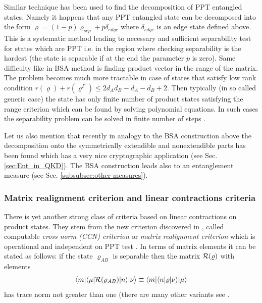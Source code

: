 \documentclass[rmp,12pt,preprint]{revtex4-2}
\begin{document}
Similar technique has been used to find the decomposition of PPT
entangled states. Namely it happens that any PPT entangled state can
be decomposed into the form $\varrho=(1-p) \varrho_{sep} +
p\delta_{edge}$ where $\delta_{edge}$ is an edge state defined
above.
This is a systematic method leading to necessary and sufficient
separability test for states which are PPT i.e. in the
region where checking separability is the hardest (the state is
separable if at the end the parameter $p$ is zero). Same difficulty
like in BSA method is finding product vector in  the range of the
matrix. The problem becomes much more tractable in case of states
that satisfy low rank condition \cite{Ho00} $r(\varrho)+
r(\varrho^{\Gamma}) \leq 2d_{A}d_{B}-d_{A}-d_{B}+2$. Then
typically (in so called generic case) the state has only finite
number of product states satisfying the range criterion which can
be found by solving polynomial equations. In such cases the
separability problem can be solved in finite number of steps
\cite{Ho00}.

Let us also mention that recently in analogy to the BSA construction
above the decomposition onto the symmetrically extendible and
nonextendible parts has been found which has a very nice cryptographic
application \cite{MoroderCL2005-povmintr} (see
Sec. \ref{sec:Ent_in_QKD}). The BSA construction leads also to an
entanglement measure (see Sec. \ref{subsubsec:other-measures}).



\subsubsection{Matrix realignment criterion and linear contractions
criteria}
\label{subsubsec:realignment}

There is yet another strong class of criteria based on linear
contractions on product states. They stem from the new criterion
discovered in \cite{Rudolph2003-JPA}, \cite{ChenWu} called computable
{\it cross norm (CCN) criterion} or {\it matrix realignment criterion}
which is operational and independent on PPT test \cite{Peres96}. In
terms of matrix elements it can be stated as follows: if the state
$\varrho_{AB}$ is separable then the matrix ${\cal R}(\varrho)$ with
elements
\begin{equation}
\langle m| \langle \mu| {\cal R}(\varrho_{AB}) |n \rangle |\nu
\rangle \equiv \langle m| \langle n| \varrho |\nu \rangle |\mu
\rangle
\end{equation}
has trace norm not greater than one (there are many other variants see
\cite{HHH02-permut}.
\end{document}
